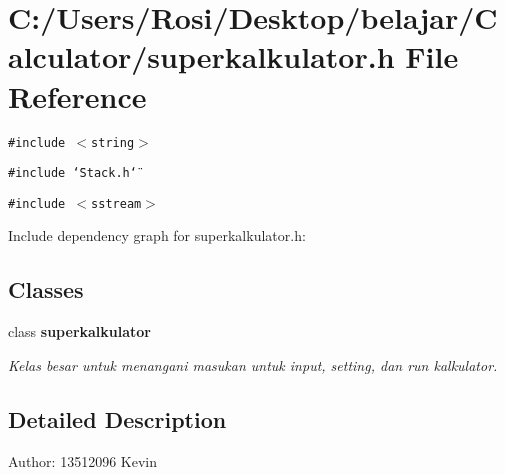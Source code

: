 \section{C:/Users/Rosi/Desktop/belajar/Calculator/superkalkulator.h File Reference}
\label{superkalkulator_8h}
{\tt \#include $<$string$>$}\par
{\tt \#include \char`\"{}Stack.h\char`\"{}}\par
{\tt \#include $<$sstream$>$}\par


Include dependency graph for superkalkulator.h:\subsection*{Classes}
\begin{CompactItemize}
\item 
class {\bf superkalkulator}
\begin{CompactList}\small\item\em Kelas besar untuk menangani masukan untuk input, setting, dan run kalkulator. \item\end{CompactList}\end{CompactItemize}


\subsection{Detailed Description}
\begin{Desc}
\item[Author:]13512096 Kevin \end{Desc}
